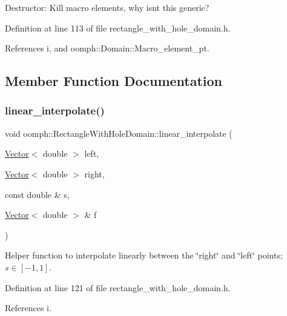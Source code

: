 Destructor\+: Kill macro elements, why isn\textquotesingle{}t this generic? 



Definition at line 113 of file rectangle\+\_\+with\+\_\+hole\+\_\+domain.\+h.



References i, and oomph\+::\+Domain\+::\+Macro\+\_\+element\+\_\+pt.



\subsection{Member Function Documentation}
\mbox{\label{classoomph_1_1RectangleWithHoleDomain_a9548ab705821b22c43850b658a893fd8}} 
\subsubsection{\texorpdfstring{linear\+\_\+interpolate()}{linear\_interpolate()}}
{\footnotesize\ttfamily void oomph\+::\+Rectangle\+With\+Hole\+Domain\+::linear\+\_\+interpolate (\begin{DoxyParamCaption}\item[{\hyperlink{classoomph_1_1Vector}{Vector}$<$ double $>$}]{left,  }\item[{\hyperlink{classoomph_1_1Vector}{Vector}$<$ double $>$}]{right,  }\item[{const double \&}]{s,  }\item[{\hyperlink{classoomph_1_1Vector}{Vector}$<$ double $>$ \&}]{f }\end{DoxyParamCaption})\hspace{0.3cm}{\ttfamily [inline]}}



Helper function to interpolate linearly between the \char`\"{}right\char`\"{} and \char`\"{}left\char`\"{} points; $ s \in [-1,1] $. 



Definition at line 121 of file rectangle\+\_\+with\+\_\+hole\+\_\+domain.\+h.



References i.



